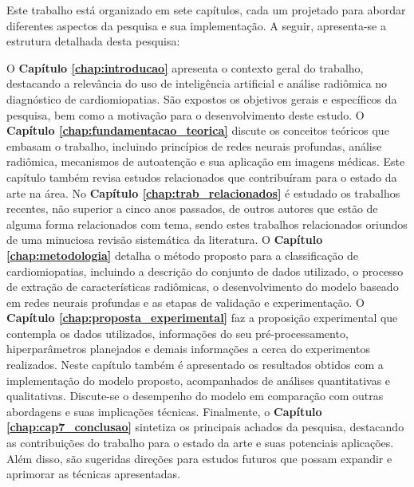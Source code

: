 Este trabalho está organizado em sete capítulos, cada um projetado para abordar diferentes aspectos da pesquisa e sua implementação. A seguir, apresenta-se a estrutura detalhada desta pesquisa:

O \textbf{Capítulo \ref{chap:introducao}} apresenta o contexto geral do trabalho, destacando a relevância do uso de inteligência artificial e análise radiômica no diagnóstico de cardiomiopatias. São expostos os objetivos gerais e específicos da pesquisa, bem como a motivação para o desenvolvimento deste estudo. O \textbf{Capítulo \ref{chap:fundamentacao_teorica}} discute os conceitos teóricos que embasam o trabalho, incluindo princípios de redes neurais profundas, análise radiômica, mecanismos de autoatenção e sua aplicação em imagens médicas. Este capítulo também revisa estudos relacionados que contribuíram para o estado da arte na área. No \textbf{Capítulo \ref{chap:trab_relacionados}} é estudado  os trabalhos recentes, não superior a cinco anos passados, de outros autores que estão de alguma forma relacionados com tema, sendo estes trabalhos relacionados oriundos de uma minuciosa revisão sistemática da literatura. O \textbf{Capítulo \ref{chap:metodologia}} detalha o método proposto para a classificação de cardiomiopatias, incluindo a descrição do conjunto de dados utilizado, o processo de extração de características radiômicas, o desenvolvimento do modelo baseado em redes neurais profundas e as etapas de validação e experimentação. O \textbf{Capítulo \ref{chap:proposta_experimental}} faz a proposição experimental que contempla os dados utilizados, informações do seu pré-processamento, hiperparâmetros planejados e demais informações a cerca do experimentos realizados. Neste capítulo também é apresentado os resultados obtidos com a implementação do modelo proposto, acompanhados de análises quantitativas e qualitativas. Discute-se o desempenho do modelo em comparação com outras abordagens e suas implicações técnicas. Finalmente, o \textbf{Capítulo \ref{chap:cap7_conclusao}} sintetiza os principais achados da pesquisa, destacando as contribuições do trabalho para o estado da arte e suas potenciais aplicações. Além disso, são sugeridas direções para estudos futuros que possam expandir e aprimorar as técnicas apresentadas.

